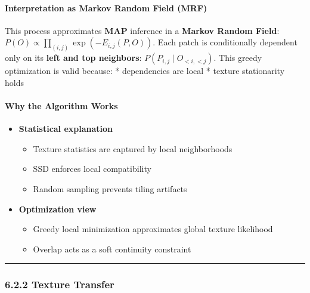 \documentclass[11pt]{article}
\providecommand{\tightlist}{%
      \setlength{\itemsep}{0pt}\setlength{\parskip}{0pt}}
\begin{document}
    \hypertarget{interpretation-as-markov-random-field-mrf}{%
\paragraph{\texorpdfstring{\textbf{Interpretation as Markov Random Field
(MRF)}}{Interpretation as Markov Random Field (MRF)}}\label{interpretation-as-markov-random-field-mrf}}

This process approximates \textbf{MAP} inference in a \textbf{Markov
Random Field}: \(P(O) \propto \prod_{(i,j)} \exp(-E_{i,j}(P,O))\). Each
patch is conditionally dependent only on its \textbf{left and top
neighbors}: \(P(P_{i,j} \mid O_{<i,<j})\). This greedy optimization is
valid because: * dependencies are local * texture stationarity holds

\hypertarget{why-the-algorithm-works}{%
\paragraph{\texorpdfstring{\textbf{Why the Algorithm
Works}}{Why the Algorithm Works}}\label{why-the-algorithm-works}}

\begin{itemize}
\item
  \textbf{Statistical explanation}

  \begin{itemize}
  \tightlist
  \item
    Texture statistics are captured by local neighborhoods
  \item
    SSD enforces local compatibility
  \item
    Random sampling prevents tiling artifacts
  \end{itemize}
\item
  \textbf{Optimization view}

  \begin{itemize}
  \tightlist
  \item
    Greedy local minimization approximates global texture likelihood
  \item
    Overlap acts as a soft continuity constraint
  \end{itemize}
\end{itemize}

\begin{center}\rule{0.5\linewidth}{0.5pt}\end{center}

\hypertarget{texture-transfer}{%
\subsubsection{\texorpdfstring{\textbf{6.2.2 Texture
Transfer}}{6.2.2 Texture Transfer}}\label{texture-transfer}}
\end{document}
